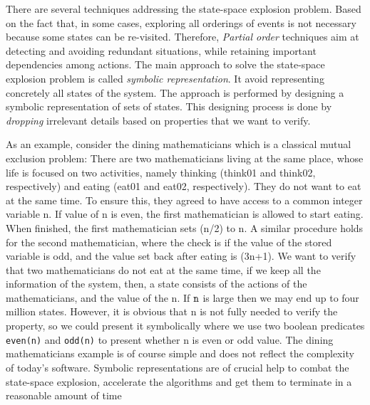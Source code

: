                    
There are several techniques addressing the state-space explosion problem.
Based on the fact that, in some cases, exploring all orderings of events is not necessary because some states can be re-visited. Therefore, \emph{Partial order} techniques aim at detecting and avoiding
redundant situations, while retaining important dependencies among
actions. The main approach to solve the state-space explosion problem is
called \emph{symbolic
   representation}. It avoid representing concretely all states of the system. The approach is performed by designing a symbolic representation of sets of states.
This designing process is done by \emph{dropping} irrelevant details based on properties that we want to verify.

As an example, consider the dining mathematicians which is a classical mutual exclusion problem: There are two mathematicians living at the same place, whose life is focused on two activities, namely thinking (think01 and think02, respectively) and eating (eat01 and eat02, respectively). They do not want to eat at the same time. To ensure this, they agreed to have access to a common integer variable n. If value of n is even, the first mathematician is allowed to start eating. When finished, the first mathematician sets (n/2) to n. A similar procedure holds for the second mathematician, where the check is if the value of the stored variable is odd, and the value set back after eating is (3n+1). We want to verify that 
two mathematicians do not eat at the same time, if we keep all the information of the system, then, a state consists of the actions of the mathematicians, and the value of the n. If $\tt n$ is large then we may end up to four million states.  However, it is obvious that n is not fully needed to verify the property, so we could present it symbolically where we use two boolean predicates {\tt even(n)} and {\tt odd(n)} to present whether n is even or odd value. The dining mathematicians example is of course simple and does not reflect the complexity of today’s software. Symbolic representations are of crucial help to combat the state-space explosion, accelerate the algorithms and get them to terminate in a reasonable amount of time


